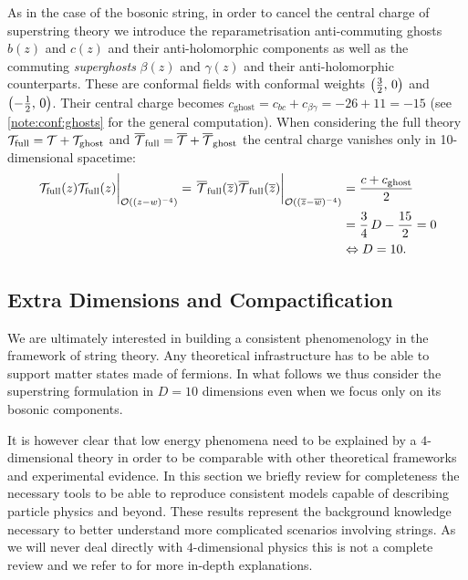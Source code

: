 As in the case of the bosonic string, in order to cancel the central charge of superstring theory we introduce the reparametrisation anti-commuting ghosts $b( z )$ and $c( z )$ and their anti-holomorphic components as well as the commuting \emph{superghosts} $\beta( z )$ and $\gamma( z )$ and their anti-holomorphic counterparts.
These are conformal fields with conformal weights $\qty( \frac{3}{2},\, 0 )$ and $\qty( -\frac{1}{2},\, 0 )$.
Their central charge becomes $c_{\text{ghost}} = c_{bc} + c_{\beta\gamma} = -26 + 11 = -15$ (see \cref{note:conf:ghosts} for the general computation).
When considering the full theory $\mathcal{T}_{\text{full}} = \mathcal{T} + \mathcal{T}_{\text{ghost}}$ and $\overline{\mathcal{T}}_{\text{full}} = \overline{\mathcal{T}} + \overline{\mathcal{T}}_{\text{ghost}}$ the central charge vanishes only in 10-dimensional spacetime:
\begin{equation}
  \begin{split}
    \eval{\cT_{\text{full}}( z ) \cT_{\text{full}}( z )}_{\order{(z - w)^{-4}}}
    =
    \eval{\overline{\cT}_{\text{full}}( \barz ) \overline{\cT}_{\text{full}}( \barz )}_{\order{(\barz - \barw)^{-4}}}
    & =
    \frac{c + c_{\text{ghost}}}{2}
    \\
    & =
    \frac{3}{4}\, D - \frac{15}{2}
    =
    0
    \\
    & \Leftrightarrow
    D = 10.
  \end{split}
  \label{eq:super:dimensions}
\end{equation}


\subsection{Extra Dimensions and Compactification}
\label{sec:CYmanifolds}

We are ultimately interested in building a consistent phenomenology in the framework of string theory.
Any theoretical infrastructure has to be able to support matter states made of fermions.
In what follows we thus consider the superstring formulation in $D = 10$ dimensions even when we focus only on its bosonic components.

It is however clear that low energy phenomena need to be explained by a $4$-dimensional theory in order to be comparable with other theoretical frameworks and experimental evidence.
In this section we briefly review for completeness the necessary tools to be able to reproduce consistent models capable of describing particle physics and beyond.
These results represent the background knowledge necessary to better understand more complicated scenarios involving strings.
As we will never deal directly with $4$-dimensional physics this is not a complete review and we refer to \cite{Anderson:2018:TASILecturesGeometric,Grana:2006:FluxCompactificationsString,Grana:2017:StringTheoryCompactifications,Uranga:2005:TASILecturesString} for more in-depth explanations.


